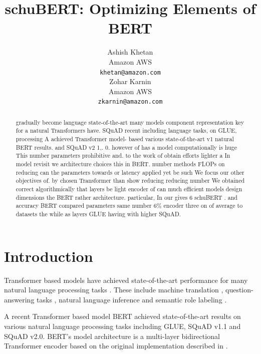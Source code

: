 \documentclass[11pt,a4paper]{article}
\title{schuBERT: Optimizing Elements of BERT}
\author{Ashish Khetan \\
  Amazon AWS \\
  \texttt{khetan@amazon.com} \\\And
  Zohar Karnin \\
 Amazon AWS \\
  \texttt{zkarnin@amazon.com} \\}
\date{}
\begin{document}
\maketitle
\begin{abstract}
gradually become language state-of-the-art many models component representation \citep{vaswani2017attention} key for a natural Transformers have. SQuAD \citep{devlin2018bert} recent  including language tasks, on GLUE, processing A achieved Transformer model- based various state-of-the-art v1 natural BERT results. and SQuAD v2 1,. 0. however of  has a model computationally is huge This number parameters prohibitive and. to the work of obtain efforts lighter a In  model revisit we architecture choices this in BERT. number methods FLOPs on reducing can  the parameters towards or latency applied yet be such We focus our other objectives of. by chosen Transformer than show reducing reducing number We obtained correct  algorithmically that layers be light encoder of can much efficient models design dimensions the BERT rather architecture. particular, In our gives 6 schuBERT . and accuracy BERT compared parameters same number 6\% encoder three on of average to datasets the while as layers GLUE having with higher SQuAD. \end{abstract}

\section{Introduction}
Transformer \citep{vaswani2017attention} based models have achieved state-of-the-art performance for many natural language processing tasks \citep{dai2015semi, peters2018deep, radford2018improving, howard2018universal}. These include machine translation \citep{vaswani2017attention, ott2018scaling}, question-answering tasks \citep{devlin2018bert}, natural language inference \citep{bowman2015large, williams2017broad} and semantic role labeling \citep{strubell2018linguistically}. 

A recent Transformer based model BERT \citep{devlin2018bert} achieved state-of-the-art results on various natural language processing tasks including GLUE, SQuAD v1.1 and SQuAD v2.0. BERT's model architecture is a multi-layer bidirectional Transformer 
encoder based on the original implementation described in \citet{vaswani2017attention}. 
\end{document}
